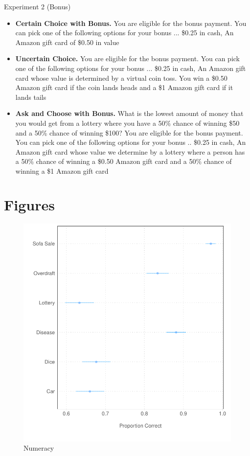 \documentclass[12pt, letterpaper]{article}
\begin{document}
Experiment 2 (Bonus)

\begin{itemize}
    \item \textbf{Certain Choice with Bonus.} You are eligible for the bonus payment. You can pick one of the following options for your bonus ... \$0.25 in cash,  An Amazon gift card of \$0.50 in value

    \item \textbf{Uncertain Choice.} You are eligible for the bonus payment. You can pick one of the following options for your bonus ... \$0.25 in cash, An Amazon gift card whose value is determined by a virtual coin toss. You win a \$0.50 Amazon gift card if the coin lands heads and a \$1 Amazon gift card if it lands tails

    \item \textbf{Ask and Choose with Bonus.} What is the lowest amount of money that you would get from a lottery where you have a 50\% chance of winning \$50 and a 50\% chance of winning \$100? You are eligible for the bonus payment. You can pick one of the following options for your bonus .. \$0.25 in cash,  An Amazon gift card whose value we determine by a lottery where a person has a 50\% chance of winning a \$0.50 Amazon gift card and a 50\% chance of winning a \$1 Amazon gift card
\end{itemize}

\section{Figures}

\begin{figure}[h]
    \centering
    \includegraphics{figs/lucid_numeracy.pdf}
    \caption{Numeracy}
    \label{fig:lucid_numeracy}
\end{figure}
\end{document}
